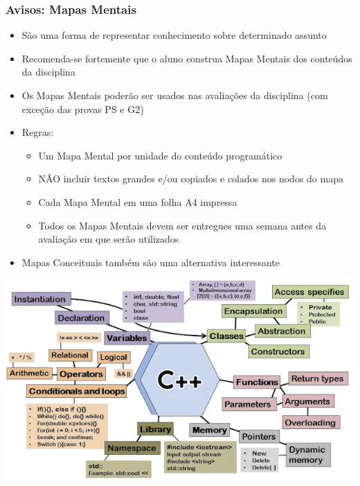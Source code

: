 \documentclass[aspectratio=169]{beamer}
\begin{document}
\begin{frame}\frametitle{Avisos: Mapas Mentais}
\begin{itemize}
	\item São uma forma de representar conhecimento sobre determinado assunto
	\item Recomenda-se fortemente que o aluno construa Mapas Mentais dos conteúdos da disciplina
	\item Os Mapas Mentais poderão ser usados nas avaliações da disciplina (com exceção das provas PS e G2)
	\item Regras:
	\begin{itemize}
		\item Um Mapa Mental por unidade do conteúdo programático
		\item NÃO incluir textos grandes e/ou copiados e colados nos nodos do mapa
		\item Cada Mapa Mental em uma folha A4 impressa
		\item Todos os Mapas Mentais devem ser entregues uma semana antes da avaliação em que serão utilizados
	\end{itemize}
	\item Mapas Conceituais também são uma alternativa interessante
\end{itemize}
\end{frame}


\begin{frame}[plain] %
    \begin{center}
        \includegraphics[width=\textwidth]{mind-map-c-plus-plus.png} %
    \end{center}
\end{frame}
\end{document}
